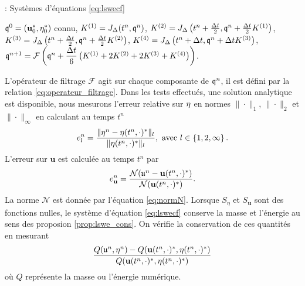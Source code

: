 \begin{center}
\begin{minipage}[H]{12cm}
  \begin{algorithm}[H]
    \caption{: Systèmes d'équations \eqref{eq:lswecf} }\label{alg:RK4_lswecf}
    \begin{algorithmic}[1]
    \State $\mathfrak{q}^0 = (\mathbf{u}_0^* , \eta_0^*)$ connu,
             \State  $K^{(1)} = J_{\Delta}(t^n, \mathfrak{q}^n)$,
             \State  $K^{(2)} = J_{\Delta}\left(t^n + \frac{\Delta t}{2}, \mathfrak{q}^n + \frac{\Delta t}{2} K^{(1)} \right)$,
             \State  $K^{(3)} = J_{\Delta}\left(t^n + \frac{\Delta t}{2}, \mathfrak{q}^n + \frac{\Delta t}{2} K^{(2)} \right)$,
             \State  $K^{(4)} = J_{\Delta}\left(t^n + \Delta t,  \mathfrak{q}^n + \Delta t K^{(3)} \right)$,  
             \State  $\mathfrak{q}^{n+1} = \mathcal{F}\left( \mathfrak{q}^n  + \dfrac{\Delta t}{6} \left( K^{(1)} + 2 K^{(2)} + 2 K^{(3)} + K^{(4)} \right) \right)$.
            \EndFor
    \end{algorithmic}
    \end{algorithm}
\end{minipage}
\end{center} 

L'opérateur de filtrage $\mathcal{F}$ agit sur chaque composante de $\mathfrak{q}^n$, il est défini par la relation \eqref{eq:operateur_filtrage}. Dans les tests effectués, une solution analytique est disponible, nous mesurons l'erreur relative sur $\mathbf{\eta}$ en normes $\| \cdot \|_1$, $\| \cdot \|_2$ et $\| \cdot \|_{\infty}$ en calculant au temps $t^n$
\begin{equation}
e_{l}^n = \dfrac{\| \mathbf{\eta}^n - \eta(t^n, \cdot)^* \|_{l}}{\| \eta(t^n, \cdot)^* \|_{l}}, \text{ avec } l \in \left\lbrace 1, 2, \infty \right\rbrace.
\end{equation}
L'erreur sur $\mathbf{u}$  est calculée au temps $t^n$ par
\begin{equation}
e_{\mathbf{u}}^n = \dfrac{\mathcal{N}(\mathfrak{u}^n - \mathbf{u}(t^n , \cdot)^*)}{\mathcal{N}(\mathbf{u}(t^n , \cdot)^*)}.
\end{equation}
La norme $\mathcal{N}$ est donnée par l'équation \eqref{eq:normN}. Lorsque $S_{\eta}$ et $S_{\mathbf{u}}$ sont des fonctions nulles, le système d'équation \eqref{eq:lswecf} conserve la masse et l'énergie au sens des proposion \ref{prop:lswe_cons}. On vérifie la conservation de ces quantités en mesurant 
\begin{equation}
\dfrac{Q(\mathfrak{u}^n, \mathbf{\eta}^n)-Q(\mathbf{u}(t^n, \cdot)^*, \eta(t^n, \cdot)^*)}{Q(\mathbf{u}(t^n,\cdot)^*, \eta(t^n, \cdot)^*)}
\end{equation}
où $Q$ représente la masse ou l'énergie numérique.


